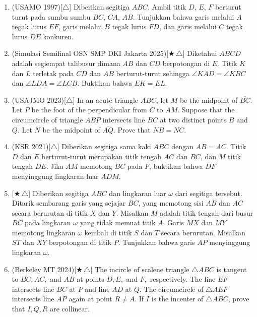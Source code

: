 \documentclass[letterpaper, 13pt]{scrartcl}
\begin{document}
\begin{enumerate}
  \item (USAMO 1997)[$\triangle$] Diberikan segitiga $ABC$. Ambil titik $D$, $E$, $F$ berturut turut pada sumbu sumbu $BC$, $CA$, $AB$. Tunjukkan bahwa garis melalui $A$ tegak lurus $EF$, garis melalui $B$ tegak lurus $FD$, dan garis melalui $C$ tegak lurus $DE$ konkuren.

  \item (Simulasi Semifinal OSN SMP DKI Jakarta 2025)[$\bigstar\,\triangle$] Diketahui $ABCD$ adalah segiempat talibusur dimana $AB$ dan $CD$ berpotongan di $E$. Titik $K$ dan $L$ terletak pada $CD$ dan $AB$ berturut-turut sehingga $\angle KAD = \angle KBC$ dan $\angle LDA = \angle LCB$. Buktikan bahwa $EK = EL$.

  \item (USAJMO 2023)[$\triangle$] In an acute triangle $ABC$, let $M$ be the midpoint of $\overline{BC}$. Let $P$ be the foot of the perpendicular from $C$ to $AM$. Suppose that the circumcircle of triangle $ABP$ intersects line $BC$ at two distinct points $B$ and $Q$. Let $N$ be the midpoint of $\overline{AQ}$. Prove that $NB=NC$.

  \item (KSR 2021)[$\triangle$] Diberikan segitiga sama kaki $ABC$ dengan $AB=AC$. Titik $D$ dan $E$ berturut-turut merupakan titik tengah $AC$ dan $BC$, dan $M$ titik tengah $DE$. Jika $AM$ memotong $BC$ pada $F$, buktikan bahwa $DF$ menyinggung lingkaran luar $ADM$.

  \item {}[$\bigstar\,\triangle$] Diberikan segitiga $ABC$ dan lingkaran luar $\omega$ dari segitiga tersebut. Ditarik sembarang garis yang sejajar $BC$, yang memotong sisi $AB$ dan $AC$ secara berurutan di titik $X$ dan $Y$. Misalkan $M$ adalah titik tengah dari busur $BC$ pada lingkaran $\omega$ yang tidak memuat titik $A$. Garis $MX$ dan $MY$ memotong lingkaran $\omega$ kembali di titik $S$ dan $T$ secara berurutan. Misalkan $ST$ dan $XY$ berpotongan di titik $P$. Tunjukkan bahwa garis $AP$ menyinggung lingkaran $\omega$.

  \newpage
  \item (Berkeley MT 2024)[$\bigstar\,\triangle$] The incircle of scalene triangle $\triangle{ABC}$ is tangent to $\overline{BC}, \overline{AC},$ and $\overline{AB}$ at points $D, E,$ and $F,$ respectively. The line $EF$ intersects line $BC$ at $P$ and line $AD$ at $Q.$ The circumcircle of $\triangle{AEF}$ intersects line $AP$ again at point $R \neq A$. If $I$ is the incenter of $\triangle{ABC}$, prove that $I,Q,R$ are collinear.


\end{enumerate}
\end{document}
